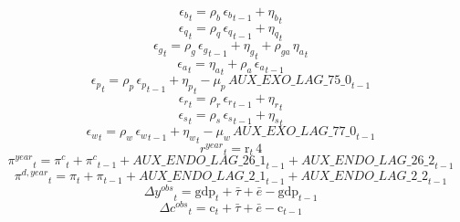 \begin{dmath}
{{\epsilon_{b}}}_{t}={{\rho_{b}}}\, {{\epsilon_{b}}}_{t-1}+{{\eta_{b}}}_{t}
\end{dmath}
\begin{dmath}
{{\epsilon_{q}}}_{t}={{\rho_{q}}}\, {{\epsilon_{q}}}_{t-1}+{{\eta_{q}}}_{t}
\end{dmath}
\begin{dmath}
{{\epsilon_{g}}}_{t}={{\rho_{g}}}\, {{\epsilon_{g}}}_{t-1}+{{\eta_{g}}}_{t}+{{\rho_{ga}}}\, {{\eta_{a}}}_{t}
\end{dmath}
\begin{dmath}
{{\epsilon_{a}}}_{t}={{\eta_{a}}}_{t}+{{\rho_{a}}}\, {{\epsilon_{a}}}_{t-1}
\end{dmath}
\begin{dmath}
{{\epsilon_{p}}}_{t}={{\rho_{p}}}\, {{\epsilon_{p}}}_{t-1}+{{\eta_{p}}}_{t}-{{\mu_{p}}}\, {AUX\_EXO\_LAG\_75\_0}_{t-1}
\end{dmath}
\begin{dmath}
{{\epsilon_{r}}}_{t}={{\rho_{r}}}\, {{\epsilon_{r}}}_{t-1}+{{\eta_{r}}}_{t}
\end{dmath}
\begin{dmath}
{{\epsilon_{s}}}_{t}={{\rho_{s}}}\, {{\epsilon_{s}}}_{t-1}+{{\eta_{s}}}_{t}
\end{dmath}
\begin{dmath}
{{\epsilon_{w}}}_{t}={{\rho_{w}}}\, {{\epsilon_{w}}}_{t-1}+{{\eta_{w}}}_{t}-{{\mu_{w}}}\, {AUX\_EXO\_LAG\_77\_0}_{t-1}
\end{dmath}
\begin{dmath}
{{r^{year}}}_{t}={{\mathrm{r}}}_{t}\, 4
\end{dmath}
\begin{dmath}
{{\pi^{year}}}_{t}={{\pi^{c}}}_{t}+{{\pi^{c}}}_{t-1}+{AUX\_ENDO\_LAG\_26\_1}_{t-1}+{AUX\_ENDO\_LAG\_26\_2}_{t-1}
\end{dmath}
\begin{dmath}
{{\pi^{d,year}}}_{t}={{\pi}}_{t}+{{\pi}}_{t-1}+{AUX\_ENDO\_LAG\_2\_1}_{t-1}+{AUX\_ENDO\_LAG\_2\_2}_{t-1}
\end{dmath}
\begin{dmath}
{{\Delta y^{obs}}}_{t}={{\mathrm{gdp}}}_{t}+{{\bar{\tau}}}+{{\bar{e}}}-{{\mathrm{gdp}}}_{t-1}
\end{dmath}
\begin{dmath}
{{\Delta c^{obs}}}_{t}={{\mathrm{c}}}_{t}+{{\bar{\tau}}}+{{\bar{e}}}-{{\mathrm{c}}}_{t-1}
\end{dmath}
